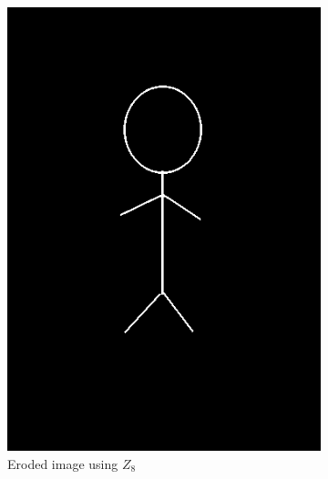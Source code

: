 \documentclass[a4paper]{article}
\begin{document}
\begin{figure}[htp]
\begin{subfigure}{.33\textwidth}
  \includegraphics[width=.9\linewidth]{ex2-erosion-z8.png}
  \caption{Eroded image using $Z_8$}
  \label{fig:sub2}
\end{subfigure}
\begin{subfigure}{.33\textwidth}
  \centering

\end{subfigure}
\end{figure}
\end{document}
